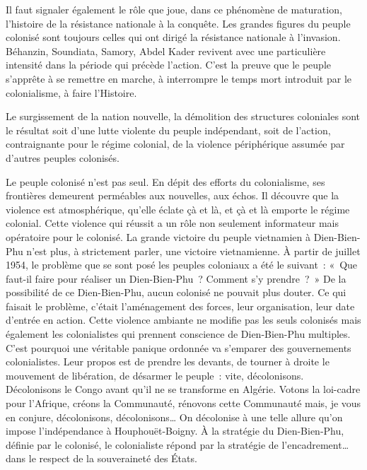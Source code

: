 \documentclass[french,twoside]{book} %
\begin{document}
Il faut signaler également le rôle que joue, dans ce phénomène de maturation, l’histoire de la résistance nationale à la conquête. Les grandes figures du peuple colonisé sont toujours celles qui ont dirigé la résistance nationale à l’invasion. Béhanzin, Soundiata, Samory, Abdel Kader revivent avec une particulière intensité dans la période qui précède l’action. C’est   la preuve que le peuple s’apprête à se remettre en marche, à interrompre le temps mort introduit par le colonialisme, à faire l’Histoire.\par
Le surgissement de la nation nouvelle, la démolition des structures coloniales sont le résultat soit d’une lutte violente du peuple indépendant, soit de l’action, contraignante pour le régime colonial, de la violence périphérique assumée par d’autres peuples colonisés.\par
\bigbreak
\noindent Le peuple colonisé n’est pas seul. En dépit des efforts du colonialisme, ses frontières demeurent perméables aux nouvelles, aux échos. Il découvre que la violence est atmosphérique, qu’elle éclate çà et là, et çà et là emporte le régime colonial. Cette violence qui réussit a un rôle non seulement informateur mais opératoire pour le colonisé. La grande victoire du peuple vietnamien à Dien-Bien-Phu n’est plus, à strictement parler, une victoire vietnamienne. À partir de juillet 1954, le problème que se sont posé les peuples coloniaux a été le suivant : « Que faut-il faire pour réaliser un Dien-Bien-Phu ? Comment s’y prendre ? » De la possibilité de ce Dien-Bien-Phu, aucun colonisé ne pouvait plus douter. Ce qui faisait le problème, c’était l’aménagement des forces, leur organisation, leur date d’entrée en action. Cette violence ambiante ne modifie pas les seuls colonisés mais également les colonialistes qui prennent conscience de Dien-Bien-Phu multiples. C’est pourquoi une véritable panique ordonnée va s’emparer des gouvernements colonialistes. Leur propos est de prendre les devants, de tourner à droite le mouvement de libération, de désarmer le peuple : vite, décolonisons. Décolonisons le Congo avant qu’il ne se transforme en Algérie. Votons la loi-cadre pour l’Afrique, créons la Communauté, rénovons cette Communauté mais, je vous en conjure, décolonisons, décolonisons… On décolonise à une telle allure qu’on impose l’indépendance à Houphouët-Boigny. À la stratégie du Dien-Bien-Phu, définie par le colonisé, le colonialiste répond par la stratégie de l’encadrement… dans le respect de la souveraineté des États.\par
\end{document}
